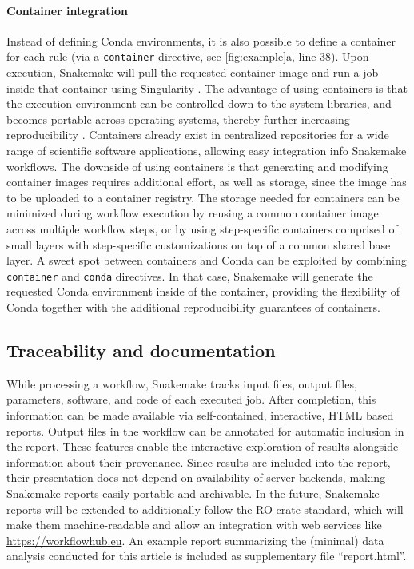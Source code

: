 \documentclass[parskip=half, DIV=18]{scrartcl}
\let\plainurl\url
\renewcommand{\url}[1]{\protect\plainurl{#1}}
\begin{document}
\paragraph{Container integration}

Instead of defining Conda environments, it is also possible to define a container for each rule (via a \lstinline!container! directive, see \autoref{fig:example}a, line 38).
Upon execution, Snakemake will pull the requested container image and run a job inside that container using Singularity \parencite{kurtzer_singularity_2017}.
The advantage of using containers is that the execution environment can be controlled down to the system libraries, and becomes portable across operating systems, thereby further increasing reproducibility \parencite{gruning_practical_2018}.
Containers already exist in centralized repositories for a wide range of scientific software applications, allowing easy integration info Snakemake workflows. 
The downside of using containers is that generating and modifying container images requires additional effort, as well as storage, since the image has to be uploaded to a container registry. 
The storage needed for containers can be minimized during workflow execution by reusing a common container image across multiple workflow steps, or by using step-specific containers comprised of small layers with step-specific customizations on top of a common shared base layer. 
A sweet spot between containers and Conda can be exploited by combining \lstinline!container! and \lstinline!conda! directives.
In that case, Snakemake will generate the requested Conda environment inside of the container, providing the flexibility of Conda together with the additional reproducibility guarantees of containers.

\subsection{Traceability and documentation}

While processing a workflow, Snakemake tracks input files, output files, parameters, software, and code of each executed job.
After completion, this information can be made available via self-contained, interactive, HTML based reports.
Output files in the workflow can be annotated for automatic inclusion in the report.
These features enable the interactive exploration of results alongside information about their provenance.
Since results are included into the report, their presentation does not depend on availability of server backends, making Snakemake reports easily portable and archivable.
In the future, Snakemake reports will be extended to additionally follow the RO-crate standard, which will make them machine-readable and allow an integration with web services like \url{https://workflowhub.eu}.
An example report summarizing the (minimal) data analysis conducted for this article is included as supplementary file ``report.html''.
\end{document}
